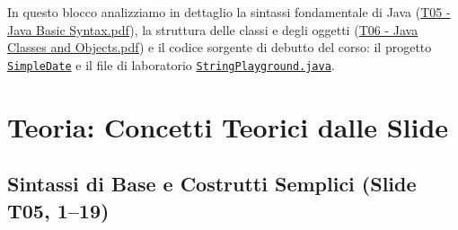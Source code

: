 \documentclass[11pt,a4paper,oneside]{report}
\newcommand{\passthrough}[1]{#1}
\begin{document}
In questo blocco analizziamo in dettaglio la sintassi fondamentale di
Java
(\href{file:///home/wally/Documenti/GitHub/Programmazione-II/25-26/Teoria-e-Esercitazioni/Slides-20260902/T05\%20-\%20Java\%20Basic\%20Syntax.pdf}{T05
- Java Basic Syntax.pdf}), la struttura delle classi e degli oggetti
(\href{file:///home/wally/Documenti/GitHub/Programmazione-II/25-26/Teoria-e-Esercitazioni/Slides-20260902/T06\%20-\%20Java\%20Classes\%20and\%20Objects.pdf}{T06
- Java Classes and Objects.pdf}) e il codice sorgente di debutto del
corso: il progetto
\href{file:///home/wally/Documenti/GitHub/Programmazione-II/25-26/Teoria-e-Esercitazioni/Codice-20260902/Lezioni05-06/SimpleDate}{\passthrough{\lstinline!SimpleDate!}}
e il file di laboratorio
\href{file:///home/wally/Documenti/GitHub/Programmazione-II/25-26/Teoria-e-Esercitazioni/Codice-20260902/Lezioni05-06/StringPlayground.java}{\passthrough{\lstinline!StringPlayground.java!}}.

\section{Teoria: Concetti Teorici dalle
Slide}\label{chap05_teoria-concetti-teorici-dalle-slide}

\subsection{Sintassi di Base e Costrutti Semplici (Slide T05,
1--19)}\label{chap05_sintassi-di-base-e-costrutti-semplici-slide-t05-119}
\end{document}
